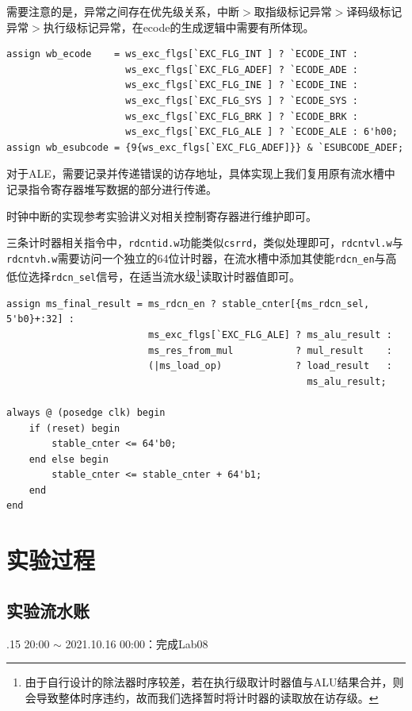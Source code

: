 \documentclass[UTF-8,twoside,cs4size]{ctexart}
\begin{document}
    需要注意的是，异常之间存在优先级关系，中断$ > $取指级标记异常$ > $译码级标记异常$ > $执行级标记异常，在ecode的生成逻辑中需要有所体现。
    \begin{verbatim}
assign wb_ecode    = ws_exc_flgs[`EXC_FLG_INT ] ? `ECODE_INT :
                     ws_exc_flgs[`EXC_FLG_ADEF] ? `ECODE_ADE :
                     ws_exc_flgs[`EXC_FLG_INE ] ? `ECODE_INE :
                     ws_exc_flgs[`EXC_FLG_SYS ] ? `ECODE_SYS :
                     ws_exc_flgs[`EXC_FLG_BRK ] ? `ECODE_BRK :
                     ws_exc_flgs[`EXC_FLG_ALE ] ? `ECODE_ALE : 6'h00;
assign wb_esubcode = {9{ws_exc_flgs[`EXC_FLG_ADEF]}} & `ESUBCODE_ADEF;
    \end{verbatim}
    
    对于ALE，需要记录并传递错误的访存地址，具体实现上我们复用原有流水槽中记录指令寄存器堆写数据的部分进行传递。
    
	时钟中断的实现参考实验讲义对相关控制寄存器进行维护即可。
    
    三条计时器相关指令中，\texttt{rdcntid.w}功能类似\texttt{csrrd}，类似处理即可，\texttt{rdcntvl.w}与\texttt{rdcntvh.w}需要访问一个独立的64位计时器，在流水槽中添加其使能\texttt{rdcn\_en}与高低位选择\texttt{rdcn\_sel}信号，在适当流水级\footnote{由于自行设计的除法器时序较差，若在执行级取计时器值与ALU结果合并，则会导致整体时序违约，故而我们选择暂时将计时器的读取放在访存级。}读取计时器值即可。
    
    \begin{verbatim}
assign ms_final_result = ms_rdcn_en ? stable_cnter[{ms_rdcn_sel, 5'b0}+:32] :
                         ms_exc_flgs[`EXC_FLG_ALE] ? ms_alu_result :
                         ms_res_from_mul           ? mul_result    :
                         (|ms_load_op)             ? load_result   :
                                                     ms_alu_result;

always @ (posedge clk) begin
    if (reset) begin
        stable_cnter <= 64'b0;
    end else begin
        stable_cnter <= stable_cnter + 64'b1;
    end
end
    \end{verbatim}
    
	\section{实验过程}
	\subsection{实验流水账}
	
	.15 20:00 $\sim$ 2021.10.16 00:00：完成Lab08
    
\end{document}
